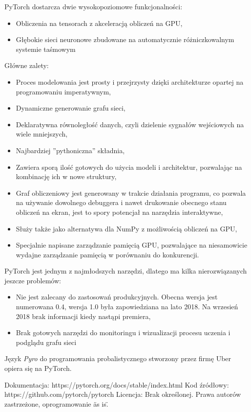 \documentclass[12pt,a4paper,twoside,titlepage,openright]{book}
\begin{document}
PyTorch dostarcza dwie wysokopoziomowe funkcjonalności:
\begin{itemize}
\item Obliczenia na tensorach z akceleracją obliczeń na GPU,
\item Głębokie sieci neuronowe zbudowane na automatycznie różniczkowalnym systemie taśmowym
\end{itemize}

Główne zalety:
\begin{itemize}
\item Proces modelowania jest prosty i przejrzysty dzięki architekturze opartej na programowaniu imperatywnym,
\item Dynamiczne generowanie grafu sieci,
\item Deklaratywna równoległość danych, czyli dzielenie sygnałów wejściowych na wiele mniejszych,
\item Najbardziej ''pythoniczna'' składnia,
\item Zawiera sporą ilość gotowych do użycia modeli i architektur, pozwalając na kombinację ich w nowe struktury,
\item Graf obliczeniowy jest generowany w trakcie działania programu, co pozwala na używanie dowolnego debuggera i nawet drukowanie obecnego stanu obliczeń na ekran, jest to spory potencjał na narzędzia interaktywne,
\item Służy także jako alternatywa dla NumPy z możliwością obliczeń na GPU,
\item Specjalnie napisane zarządzanie pamięcią GPU, pozwalające na niesamowicie wydajne zarządzanie pamięcią w porównaniu do konkurencji.
\end{itemize}

PyTorch jest jednym z najmłodszych narzędzi, dlatego ma kilka nierozwiązanych jeszcze problemów:
\begin{itemize}
\item Nie jest zalecany do zastosowań produkcyjnych. Obecna wersja jest numerowana 0.4, wersja 1.0 była zapowiedziana na lato 2018. Na wrzesień 2018 brak informacji kiedy nastąpi premiera,
\item Brak gotowych narzędzi do monitoringu i wizualizacji procesu uczenia i podglądu grafu sieci
\end{itemize}\cite{book:2226069}

Język \textit{Pyro} do programowania probalistycznego stworzony przez firmę Uber opiera się na PyTorch.

\noindent
\newline
Dokumentacja: https://pytorch.org/docs/stable/index.html
\newline
Kod źródłowy: https://github.com/pytorch/pytorch
\newline
Licencja: Brak określonej. Prawa autorów zastrzeżone, oprogramowanie \"as is\".
\end{document}
